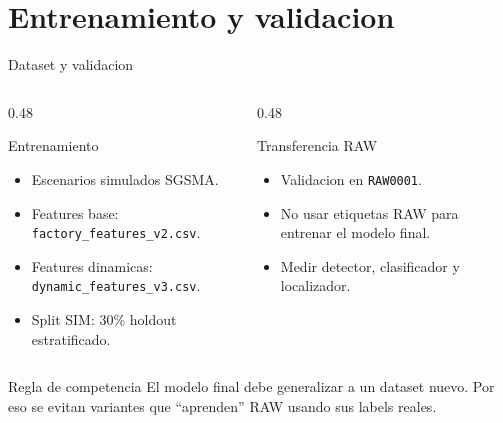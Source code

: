 \documentclass[10pt,aspectratio=169]{beamer}
\newcommand{\code}[1]{\texttt{\footnotesize #1}}
\begin{document}
\section{Entrenamiento y validacion}

\begin{frame}{Dataset y validacion}
\small
\begin{columns}[T,totalwidth=\textwidth]
\begin{column}{0.48\textwidth}
\begin{block}{Entrenamiento}
\begin{itemize}
  \item Escenarios simulados SGSMA.
  \item Features base: \code{factory\_features\_v2.csv}.
  \item Features dinamicas: \code{dynamic\_features\_v3.csv}.
  \item Split SIM: 30\% holdout estratificado.
\end{itemize}
\end{block}
\end{column}
\begin{column}{0.48\textwidth}
\begin{block}{Transferencia RAW}
\begin{itemize}
  \item Validacion en \code{RAW0001}.
  \item No usar etiquetas RAW para entrenar el modelo final.
  \item Medir detector, clasificador y localizador.
\end{itemize}
\end{block}
\end{column}
\end{columns}
\vspace{2mm}
\begin{alertblock}{Regla de competencia}
El modelo final debe generalizar a un dataset nuevo. Por eso se evitan variantes que ``aprenden'' RAW usando sus labels reales.
\end{alertblock}
\end{frame}
\end{document}
